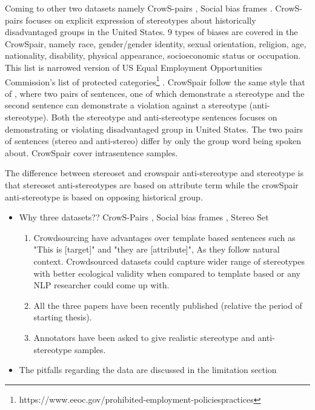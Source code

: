 Coming to other two datasets namely CrowS-pairs \cite{nangia2020crows}, Social bias frames \cite{sap2019social}. CrowS-pairs focuses on explicit expression of stereotypes about historically disadvantaged groups in the United States. 9 types of biases are covered in the CrowSpair, namely race, gender/gender identity, sexual orientation, religion, age, nationality, disability, physical appearance, socioeconomic status or occupation. This list is narrowed version of US Equal Employment Opportunities Commission's list of protected categories\footnote{https://www.eeoc.gov/prohibited-employment-policiespractices} \cite{nangia2020crows}. CrowSpair follow the same style that of \cite{nadeem2020stereoset}, where two pairs of sentences, one of which demonstrate a stereotype and the second sentence can demonstrate a violation against a stereotype (anti-stereotype). Both the stereotype and anti-stereotype sentences focuses on demonstrating or violating disadvantaged group in United States. The two pairs of sentences (stereo and anti-stereo) differ by only the group word being spoken about. CrowSpair cover intrasentence samples.

The difference between stereoset and crowspair anti-stereotype and stereotype is that stereoset anti-stereotypes are based on attribute term while the crowSpair anti-stereotype is based on opposing historical group. 

\begin{itemize}
    \item Why three datasets?? CrowS-Pairs \cite{nangia2020crows}, Social bias frames \cite{sap2019social}, Stereo Set \cite{nadeem2020stereoset}
    \begin{enumerate}
        \item Crowdsourcing have advantages over template based sentences such as "This is [target]" and "they are [attribute]", As they follow natural context. Crowdsourced datasets could capture wider range of stereotypes with better ecological validity when compared to template based or any NLP researcher could come up with. \cite{blodgett2021stereotyping}
        \item All the three papers have been recently published (relative the period of starting thesis).
        \item Annotators have been asked to give realistic stereotype and anti-stereotype samples.
    \end{enumerate}
    \item The pitfalls regarding the data are discussed in the limitation section 
\end{itemize}
